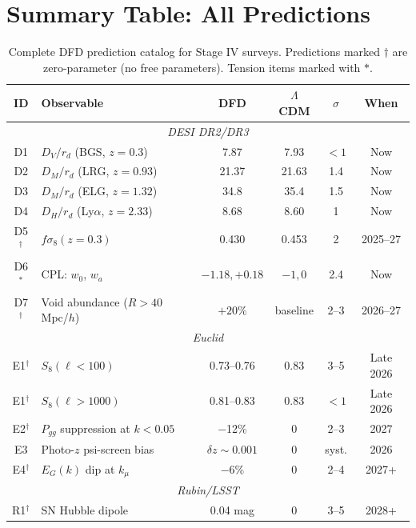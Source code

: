 \documentclass[12pt]{article}
\newcommand{\LCDM}{$\Lambda$CDM}
\begin{document}
\section{Summary Table: All Predictions}
\label{sec:summary}

\begin{table}[H]
\centering
\caption{Complete DFD prediction catalog for Stage IV surveys. Predictions marked $\dagger$ are zero-parameter (no free parameters). Tension items marked with $\ast$.}
\label{tab:master}
\small
\begin{tabular}{clcccc}
\toprule
\textbf{ID} & \textbf{Observable} & \textbf{DFD} & \textbf{\LCDM} & \textbf{$\sigma$} & \textbf{When} \\
\midrule
\multicolumn{6}{c}{\textit{DESI DR2/DR3}} \\
\midrule
D1 & $D_V/r_d$ (BGS, $z=0.3$) & 7.87 & 7.93 & $<1$ & Now \\
D2 & $D_M/r_d$ (LRG, $z=0.93$) & 21.37 & 21.63 & 1.4 & Now \\
D3 & $D_M/r_d$ (ELG, $z=1.32$) & 34.8 & 35.4 & 1.5 & Now \\
D4 & $D_H/r_d$ (Ly$\alpha$, $z=2.33$) & 8.68 & 8.60 & 1 & Now \\
D5$^\dagger$ & $f\sigma_8(z=0.3)$ & 0.430 & 0.453 & 2 & 2025--27 \\
D6$^\ast$ & CPL: $w_0$, $w_a$ & $-1.18, +0.18$ & $-1, 0$ & 2.4 & Now \\
D7$^\dagger$ & Void abundance ($R>40$ Mpc/$h$) & $+20\%$ & baseline & 2--3 & 2026--27 \\
\midrule
\multicolumn{6}{c}{\textit{Euclid}} \\
\midrule
E1$^\dagger$ & $S_8(\ell<100)$ & 0.73--0.76 & 0.83 & 3--5 & Late 2026 \\
E1$^\dagger$ & $S_8(\ell>1000)$ & 0.81--0.83 & 0.83 & $<1$ & Late 2026 \\
E2$^\dagger$ & $P_{gg}$ suppression at $k<0.05$ & $-$12\% & 0 & 2--3 & 2027 \\
E3 & Photo-$z$ psi-screen bias & $\delta z\sim 0.001$ & 0 & syst. & 2026 \\
E4$^\dagger$ & $E_G(k)$ dip at $k_\mu$ & $-$6\% & 0 & 2--4 & 2027+ \\
\midrule
\multicolumn{6}{c}{\textit{Rubin/LSST}} \\
\midrule
R1$^\dagger$ & SN Hubble dipole & 0.04 mag & 0 & 3--5 & 2028+ \\

\end{tabular}
\end{table}
\end{document}
